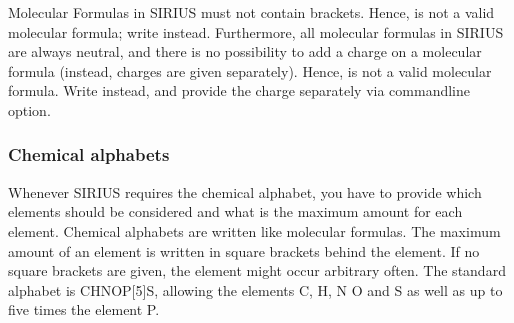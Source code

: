 \documentclass[letterpaper,10pt,openany,oneside]{sphinxmanual}
\begin{document}
Molecular Formulas in SIRIUS must not contain brackets.
Hence,  is not a valid molecular formula; write 
instead.  Furthermore, all molecular formulas in SIRIUS are always neutral,
and there is no possibility to add a charge on a molecular formula (instead,
charges are given separately). Hence,  is not a valid molecular
formula.  Write  instead, and provide the charge separately via
commandline option.


\subsubsection{Chemical alphabets}
\label{commandline:alphabets}\label{commandline:chemical-alphabets}
Whenever SIRIUS requires the chemical alphabet, you have to provide which elements should be considered and what is the maximum amount for each element. Chemical alphabets are written like molecular formulas. The maximum amount of an element is written in square brackets behind the element. If no square brackets are given, the element might occur arbitrary often. The standard alphabet is CHNOP{[}5{]}S, allowing the elements C, H, N O and S as well as up to five times the element P.
\end{document}
